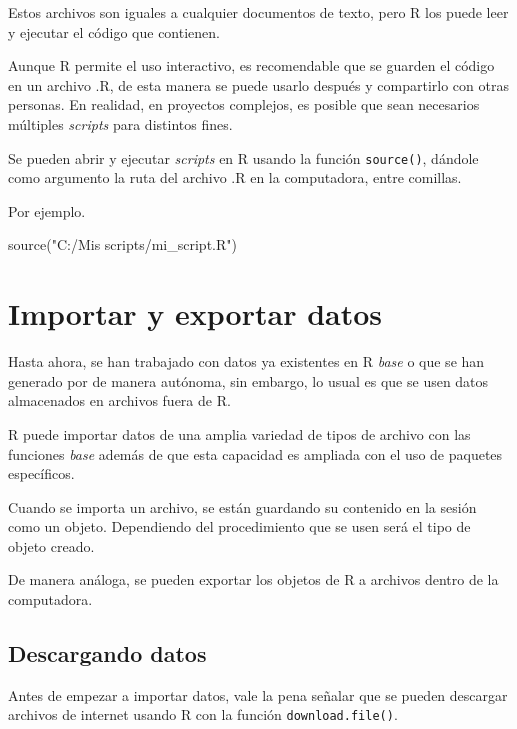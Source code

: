 \documentclass[
]{book}
\newenvironment{Shaded}{\begin{snugshade}}{\end{snugshade}}
\newcommand{\FunctionTok}[1]{\textcolor[rgb]{0.00,0.00,0.00}{#1}}
\newcommand{\NormalTok}[1]{#1}
\newcommand{\StringTok}[1]{\textcolor[rgb]{0.31,0.60,0.02}{#1}}
\begin{document}
Estos archivos son iguales a cualquier documentos de texto, pero R los puede leer y ejecutar el código que contienen.

Aunque R permite el uso interactivo, es recomendable que se guarden el código en un archivo .R, de esta manera se puede usarlo después y compartirlo con otras personas. En realidad, en proyectos complejos, es posible que sean necesarios múltiples \emph{scripts} para distintos fines.

Se pueden abrir y ejecutar \emph{scripts} en R usando la función \texttt{source()}, dándole como argumento la ruta del archivo .R en la computadora, entre comillas.

Por ejemplo.

\begin{Shaded}
\begin{Highlighting}[]
\FunctionTok{source}\NormalTok{(}\StringTok{"C:/Mis scripts/mi\_script.R"}\NormalTok{)}
\end{Highlighting}
\end{Shaded}

\hypertarget{importar-y-exportar-datos}{%
\chapter{Importar y exportar datos}\label{importar-y-exportar-datos}}

Hasta ahora, se han trabajado con datos ya existentes en R \emph{base} o que se han generado por de manera autónoma, sin embargo, lo usual es que se usen datos almacenados en archivos fuera de R.

R puede importar datos de una amplia variedad de tipos de archivo con las funciones \emph{base} además de que esta capacidad es ampliada con el uso de paquetes específicos.

Cuando se importa un archivo, se están guardando su contenido en la sesión como un objeto. Dependiendo del procedimiento que se usen será el tipo de objeto creado.

De manera análoga, se pueden exportar los objetos de R a archivos dentro de la computadora.

\hypertarget{descargando-datos}{%
\section{Descargando datos}\label{descargando-datos}}

Antes de empezar a importar datos, vale la pena señalar que se pueden descargar archivos de internet usando R con la función \texttt{download.file()}.
\end{document}
